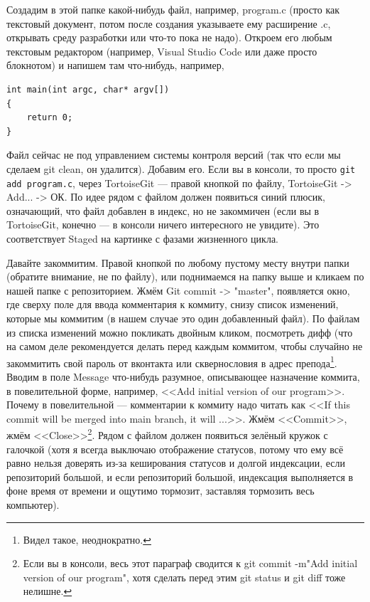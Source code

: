 \documentclass{../../text-style}
\begin{document}
Создадим в этой папке какой-нибудь файл, например, program.c (просто как текстовый документ, потом после создания указываете ему расширение .c, открывать среду разработки или что-то пока не надо). Откроем его любым текстовым редактором (например, Visual Studio Code или даже просто блокнотом) и напишем там что-нибудь, например,

\begin{verbatim}
int main(int argc, char* argv[])
{
    return 0;
}
\end{verbatim}

Файл сейчас не под управлением системы контроля версий (так что если мы сделаем git clean, он удалится). Добавим его. Если вы в консоли, то просто \verb|git add program.c|, через TortoiseGit --- правой кнопкой по файлу, TortoiseGit -> Add... -> ОК. По идее рядом с файлом должен появиться синий плюсик, означающий, что файл добавлен в индекс, но не закоммичен (если вы в TortoiseGit, конечно --- в консоли ничего интересного не увидите). Это соответствует Staged на картинке с фазами жизненного цикла.

Давайте закоммитим. Правой кнопкой по любому пустому месту внутри папки (обратите внимание, не по файлу), или поднимаемся на папку выше и кликаем по нашей папке с репозиторием. Жмём Git commit -> "master", появляется окно, где сверху поле для ввода комментария к коммиту, снизу список изменений, которые мы коммитим (в нашем случае это один добавленный файл). По файлам из списка изменений можно покликать двойным кликом, посмотреть дифф (что на самом деле рекомендуется делать перед каждым коммитом, чтобы случайно не закоммитить свой пароль от вконтакта или сквернословия в адрес препода\footnote{Видел такое, неоднократно.}. Вводим в поле Message что-нибудь разумное, описывающее назначение коммита, в повелительной форме, например, <<Add initial version of our program>>. Почему в повелительной --- комментарии к коммиту надо читать как <<If this commit will be merged into main branch, it will ...>>. Жмём <<Commit>>, жмём <<Close>>\footnote{Если вы в консоли, весь этот параграф сводится к git commit -m"Add initial version of our program", хотя сделать перед этим git status и git diff тоже нелишне.}. Рядом с файлом должен появиться зелёный кружок с галочкой (хотя я всегда выключаю отображение статусов, потому что ему всё равно нельзя доверять из-за кеширования статусов и долгой индексации, если репозиторий большой, и если репозиторий большой, индексация выполняется в фоне время от времени и ощутимо тормозит, заставляя тормозить весь компьютер).
\end{document}
